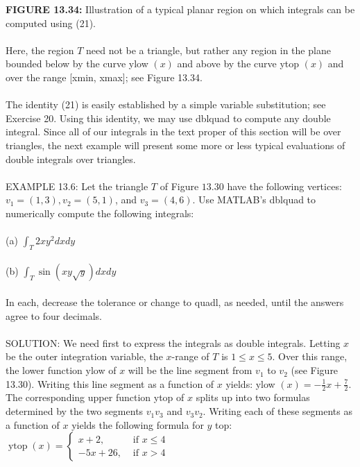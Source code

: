 \documentclass[../main.tex]{subfiles}
\begin{document}
\textbf{FIGURE 13.34:} Illustration of a typical planar region on which integrals can be computed 
using (21). 
\\
\\
Here, the region $T$ need not be a triangle, but rather any region in the plane bounded below by the curve ylow $(x)$ and above by the curve ytop $(x)$ and over the range [xmin, xmax]; see Figure 13.34.
\\
\\
The identity (21) is easily established by a simple variable substitution; see Exercise 20. Using this identity, we may use dblquad to compute any double integral. Since all of our integrals in the text proper of this section will be over triangles, the next example will present some more or less typical evaluations of double integrals over triangles.
\\
\\
EXAMPLE 13.6: Let the triangle $T$ of Figure $13.30$ have the following vertices: $v_{1}=(1,3), v_{2}=(5,1)$, and $v_{3}=(4,6)$. Use MATLAB's dblquad to numerically compute the following integrals:
\\
\\
(a) $\int_{T} 2 x y^{2} d x d y$
\\
\\
(b) $\int_{T} \sin (x y \sqrt{y}) d x d y$
\\
\\
In each, decrease the tolerance or change to quadl, as needed, until the answers agree to four decimals.
\\
\\
SOLUTION: We need first to express the integrals as double integrals. Letting $x$ be the outer integration variable, the $x$-range of $T$ is $1 \leq x \leq 5$. Over this range, the lower function ylow of $x$ will be the line segment from $v_{1}$ to $v_{2}$ (see Figure 13.30). Writing this line segment as a function of $x$ yields: ylow $(x)=-\frac{1}{2} x+\frac{7}{2}$. The corresponding upper function ytop of $x$ splits up into two formulas determined by the two segments $v_{1} v_{3}$ and $v_{3} v_{2}$. Writing each of these segments as a function of $x$ yields the following formula for $y$ top: $\operatorname{ytop}(x)= \begin{cases}x+2, & \text { if } x \leq 4 \\ -5 x+26, & \text { if } x>4\end{cases}$
\\
\\
\\
\end{document}
